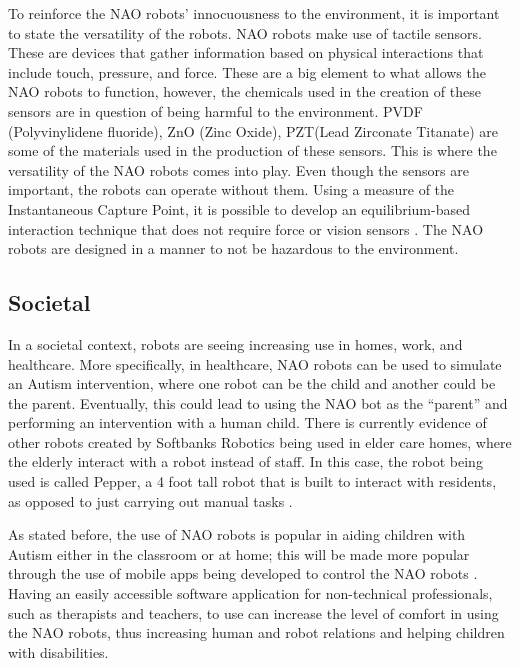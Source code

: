 To reinforce the NAO robots’ innocuousness to the environment, it is important to state the versatility of the robots. NAO robots make use of tactile sensors. These are devices that gather information based on physical interactions that include touch, pressure, and force. These are a big element to what allows the NAO robots to function, however, the chemicals used in the creation of these sensors are in question of being harmful to the environment. PVDF (Polyvinylidene fluoride), ZnO (Zinc Oxide), PZT(Lead Zirconate Titanate) are some of the materials used in the production of these sensors. This is where the versatility of the NAO robots comes into play. Even though the sensors are important, the robots can operate without them. Using a measure of the Instantaneous Capture Point, it is possible to develop an equilibrium-based interaction technique that does not require force or vision sensors \cite{6907003}. The NAO robots are designed in a manner to not be hazardous to the environment.\par

\subsection{Societal}

In a societal context, robots are seeing increasing use in homes, work, and healthcare.  More specifically, in healthcare, NAO robots can be used to simulate an Autism intervention, where one robot can be the child and another could be the parent.  Eventually, this could lead to using the NAO bot as the “parent” and performing an intervention with a human child.  There is currently evidence of other robots created by Softbanks Robotics being used in elder care homes, where the elderly interact with a robot instead of staff.  In this case, the robot being used is called Pepper, a 4 foot tall robot that is built to interact with residents, as opposed to just carrying out manual tasks \cite{lucy}.\par

As stated before, the use of NAO robots is popular in aiding children with Autism either in the classroom or at home; this will be made more popular through the use of mobile apps being developed to control the NAO robots \cite{7006084}.  Having an easily accessible software application for non-technical professionals, such as therapists and teachers, to use can increase the level of comfort in using the NAO robots, thus increasing human and robot relations and helping children with disabilities.\par

